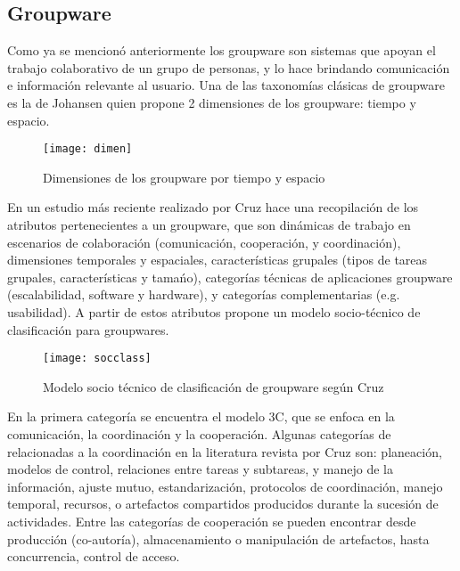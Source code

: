 \subsection{Groupware}
Como ya se mencion\'o anteriormente los groupware son sistemas que apoyan el trabajo colaborativo de un grupo de personas, y lo hace brindando comunicaci\'on e informaci\'on relevante al usuario. Una de las taxonom\'ias cl\'asicas de groupware es la de Johansen \cite{johansen1988groupware} quien propone 2 dimensiones de los groupware: tiempo y espacio.

\begin{figure}[h!]
  \centering
  \texttt{[image: dimen]}
  \caption{Dimensiones de los groupware por tiempo y espacio \cite{johansen1988groupware}}
\end{figure}

En un estudio m\'as reciente realizado por Cruz \cite{cruz2012towards} hace una recopilaci\'on de los atributos pertenecientes a un groupware, que son din\'amicas de trabajo en escenarios de colaboraci\'on (comunicaci\'on, cooperaci\'on, y coordinaci\'on), dimensiones temporales y espaciales, caracter\'isticas grupales (tipos de tareas grupales, caracter\'isticas y tama\'no), categor\'ias t\'ecnicas de aplicaciones groupware (escalabilidad, software y hardware), y categor\'ias complementarias (e.g. usabilidad). A partir de estos atributos propone un modelo socio-t\'ecnico de clasificaci\'on para groupwares.

\begin{figure}[h!]
  \centering
  \texttt{[image: socclass]}
  \caption{Modelo socio t\'ecnico de clasificaci\'on de groupware seg\'un Cruz \cite{cruz2012towards}}
\end{figure}

En la primera categor\'ia se encuentra el modelo 3C, que se enfoca en la comunicaci\'on, la coordinaci\'on y la cooperaci\'on.  Algunas categor\'ias de relacionadas a la coordinaci\'on en la literatura revista por Cruz \cite{cruz2012towards} son: planeaci\'on, modelos de control, relaciones entre tareas y subtareas, y manejo de la informaci\'on, ajuste mutuo, estandarizaci\'on, protocolos de coordinaci\'on, manejo temporal, recursos, o artefactos compartidos producidos durante la sucesi\'on de actividades. Entre las categor\'ias de cooperaci\'on se pueden encontrar desde producci\'on (co-autor\'ia), almacenamiento o manipulaci\'on de artefactos, hasta concurrencia, control de acceso.

